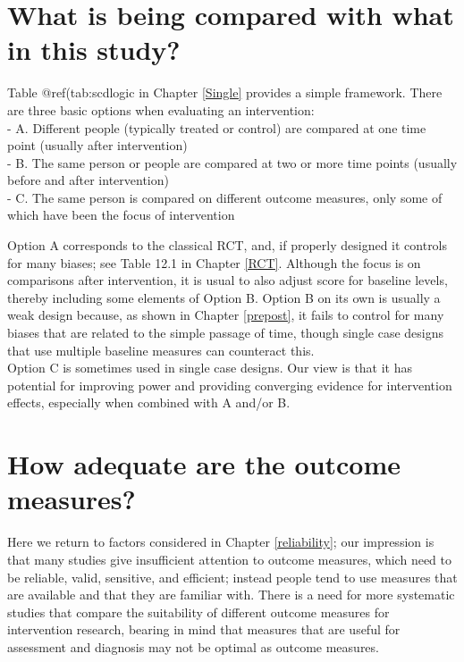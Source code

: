 \documentclass{krantz}
\begin{document}
\hypertarget{what-is-being-compared-with-what-in-this-study}{%
\section{What is being compared with what in this study?}\label{what-is-being-compared-with-what-in-this-study}}

Table @ref(tab:scdlogic in Chapter \ref{Single} provides a simple framework. There are three basic options when evaluating an intervention:\\
- A. Different people (typically treated or control) are compared at one time point (usually after intervention)\\
- B. The same person or people are compared at two or more time points (usually before and after intervention)\\
- C. The same person is compared on different outcome measures, only some of which have been the focus of intervention

Option A corresponds to the classical RCT, and, if properly designed it controls for many biases; see Table 12.1 in Chapter \ref{RCT}. Although the focus is on comparisons after intervention, it is usual to also adjust score for baseline levels, thereby including some elements of Option B. Option B on its own is usually a weak design because, as shown in Chapter \ref{prepost}, it fails to control for many biases that are related to the simple passage of time, though single case designs that use multiple baseline measures can counteract this.\\
Option C is sometimes used in single case designs. Our view is that it has potential for improving power and providing converging evidence for intervention effects, especially when combined with A and/or B.

\hypertarget{how-adequate-are-the-outcome-measures}{%
\section{How adequate are the outcome measures?}\label{how-adequate-are-the-outcome-measures}}

Here we return to factors considered in Chapter \ref{reliability}; our impression is that many studies give insufficient attention to outcome measures, which need to be reliable, valid, sensitive, and efficient; instead people tend to use measures that are available and that they are familiar with. There is a need for more systematic studies that compare the suitability of different outcome measures for intervention research, bearing in mind that measures that are useful for assessment and diagnosis may not be optimal as outcome measures.
\end{document}
